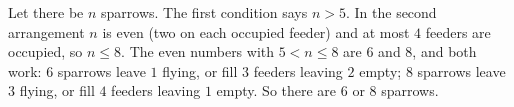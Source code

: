 Let there be $n$ sparrows. The first condition says $n>5$. In the second arrangement $n$ is even (two on each occupied feeder) and at most $4$ feeders are occupied, so $n\le8$. The even numbers with $5<n\le8$ are $6$ and $8$, and both work: $6$ sparrows leave $1$ flying, or fill $3$ feeders leaving $2$ empty; $8$ sparrows leave $3$ flying, or fill $4$ feeders leaving $1$ empty. So there are $\boxed{6\text{ or }8}$ sparrows.
